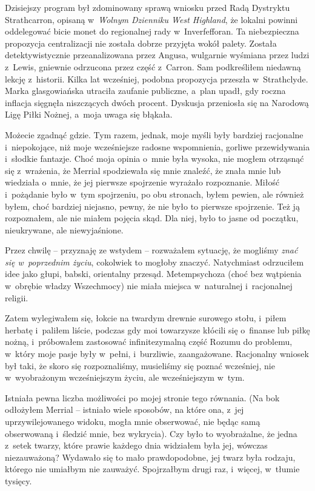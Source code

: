 \documentclass[oneside,polish,11pt,sfheadings]{mwbk}
\begin{document}
Dzisiejszy program był zdominowany sprawą wniosku przed Radą Dystryktu
Strathcarron, opisaną w~\textit{Wolnym Dzienniku West Highland}, że
lokalni powinni oddelegować bicie monet do regionalnej rady w~Inverfefforan. Ta niebezpieczna propozycja centralizacji nie została
dobrze przyjęta wokół palety. Została detektywistycznie przeanalizowana
przez Angusa, wulgarnie wyśmiana przez ludzi z~Lewis, gniewnie odrzucona
przez część z~Carron. Sam podkreśliłem niedawną lekcję z~historii. Kilka
lat wcześniej, podobna propozycja przeszła w~Strathclyde. Marka
glasgowiańska utraciła zaufanie publiczne, a~plan upadł, gdy roczna
inflacja sięgnęła niszczących dwóch procent. Dyskusja przeniosła się na
Narodową Ligę Piłki Nożnej, a~moja uwaga się błąkała.

Możecie zgadnąć gdzie. Tym razem, jednak, moje myśli były bardziej
racjonalne i~niepokojące, niż moje wcześniejsze radosne wspomnienia,
gorliwe przewidywania i~słodkie fantazje. Choć moja opinia o~mnie była
wysoka, nie mogłem otrząsnąć się z~wrażenia, że Merrial spodziewała się
mnie znaleźć, że znała mnie lub wiedziała o~mnie, że jej pierwsze
spojrzenie wyrażało rozpoznanie. Miłość i~pożądanie było w~tym
spojrzeniu, po obu stronach, byłem pewien, ale również byłem, choć
bardziej niejasno, pewny, że nie było to pierwsze spojrzenie. Też ją
rozpoznałem, ale nie miałem pojęcia skąd. Dla niej, było to jasne od
początku, nieukrywane, ale niewyjaśnione.

Przez chwilę -- przyznaję ze wstydem -- rozważałem sytuację, że mogliśmy
\textit{znać się w~poprzednim życiu}, cokolwiek to mogłoby znaczyć.
Natychmiast odrzuciłem idee jako głupi, babski, orientalny przesąd.
Metempsychoza (choć bez wątpienia w~obrębie władzy Wszechmocy) nie miała
miejsca w~naturalnej i~racjonalnej religii.

Zatem wylegiwałem się, łokcie na twardym drewnie surowego stołu, i~piłem
herbatę i~paliłem liście, podczas gdy moi towarzysze kłócili się o~finanse lub piłkę nożną, i~próbowałem zastosować infinitezymalną część
Rozumu do problemu, w~który moje pasje były w~pełni, i~burzliwie,
zaangażowane. Racjonalny wniosek był taki, że skoro się rozpoznaliśmy,
musieliśmy się poznać wcześniej, nie w~wyobrażonym wcześniejszym życiu,
ale wcześniejszym w~tym.

Istniała pewna liczba możliwości po mojej stronie tego równania. (Na bok
odłożyłem Merrial -- istniało wiele sposobów, na które ona, z~jej
uprzywilejowanego widoku, mogła mnie obserwować, nie będąc samą
obserwowaną i~śledzić mnie, bez wykrycia). Czy było to wyobrażalne, że
jedna z~setek twarzy, które prawie każdego dnia widziałem była jej,
wówczas niezauważoną? Wydawało się to mało prawdopodobne, jej twarz była
rodzaju, którego nie umiałbym nie zauważyć. Spojrzałbym drugi raz, i~więcej, w~tłumie tysięcy.
\end{document}
